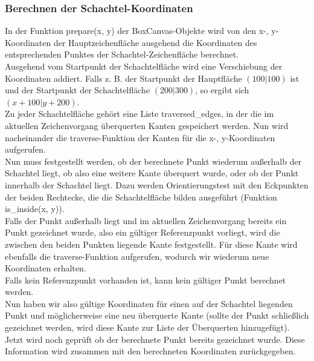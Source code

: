 \subsubsection{Berechnen der Schachtel-Koordinaten}
\label{subsubsec:schachtelkoordinaten}

In der Funktion prepare(x, y) der BoxCanvas-Objekte wird von den x-, y-Koordinaten der Hauptzeichenfläche ausgehend die Koordinaten des entsprechenden Punktes der Schachtel-Zeichenfläche berechnet.\\

Ausgehend vom Startpunkt der Schachtelfläche wird eine Verschiebung der Koordinaten addiert. Falls z. B. der Startpunkt der Hauptfläche $(100|100)$ ist und der Startpunkt der Schachtelfläche $(200|300)$, so ergibt sich $(x+100|y+200)$.\\

Zu jeder Schachtelfläche gehört eine Liste traversed\_edges, in der die im aktuellen Zeichenvorgang überquerten Kanten gespeichert werden. Nun wird nacheinander die traverse-Funktion der Kanten für die x-, y-Koordinaten aufgerufen.\\

Nun muss festgestellt werden, ob der berechnete Punkt wiederum außerhalb der Schachtel liegt, ob also eine weitere Kante überquert wurde, oder ob der Punkt innerhalb der Schachtel liegt. Dazu werden Orientierungstest mit den Eckpunkten der beiden Rechtecke, die die Schachtelfläche bilden ausgeführt (Funktion is\_inside(x, y)).\\

Falls der Punkt außerhalb liegt und im aktuellen Zeichenvorgang bereits ein Punkt gezeichnet wurde, also ein gültiger Referenzpunkt vorliegt, wird die zwischen den beiden Punkten liegende Kante festgestellt. Für diese Kante wird ebenfalls die traverse-Funktion aufgerufen, wodurch wir wiederum neue Koordinaten erhalten.\\

Falls kein Referenzpunkt vorhanden ist, kann kein gültiger Punkt berechnet werden.\\

Nun haben wir also gültige Koordinaten für einen auf der Schachtel liegenden Punkt und möglicherweise eine neu überquerte Kante (sollte der Punkt schließlich gezeichnet werden, wird diese Kante zur Liste der Überquerten hinzugefügt). Jetzt wird noch geprüft ob der berechnete Punkt bereits gezeichnet wurde. Diese Information wird zusammen mit den berechneten Koordinaten zurückgegeben.\\


